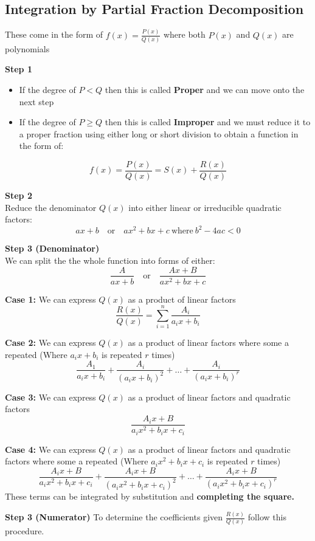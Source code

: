 \documentclass{template}
\begin{document}
\subsection{Integration by Partial Fraction Decomposition}
These come in the form of $\displaystyle f(x)=\frac{P(x)}{Q(x)}$ where both $P(x)$ and $Q(x)$ are polynomials

\textbf{Step 1}
\begin{itemize}
    \item If the degree of $P<Q$ then this is called \textbf{Proper} and we can move onto the next step
    \item If the degree of $P\geq Q$ then this is called \textbf{Improper} and we must reduce it to a proper fraction using either long or short division to obtain a function in the form of:
\end{itemize}
$$f(x)=\frac{P(x)}{Q(x)}=S(x)+\frac{R(x)}{Q(x)}$$

\textbf{Step 2} \\
Reduce the denominator $Q(x)$ into either linear or irreducible quadratic factors:
$$ax+b \quad \text{or} \quad ax^2+bx+c \ \text{where} \ b^2-4ac<0$$

\textbf{Step 3 (Denominator)}\\
We can split the the whole function into forms of either:
$$\frac{A}{ax+b} \quad \text{or} \quad \frac{Ax+B}{ax^2+bx+c}$$

\textbf{Case 1: } We can express $Q(x)$ as a product of linear factors
$$\frac{R(x)}{Q(x)}=\sum_{i=1}^n\frac{A_i}{a_ix+b_i}$$

\textbf{Case 2: } We can express $Q(x)$ as a product of linear factors where some a repeated  (Where $a_ix+b_i$ is repeated $r$ times)
$$\frac{A_1}{a_ix+b_i}+\frac{A_i}{(a_ix+b_i)^2}+\dots+\frac{A_i}{(a_ix+b_i)^r}$$

\textbf{Case 3: } We can express $Q(x)$ as a product of linear factors and quadratic factors
$$\frac{A_ix+B}{a_ix^2+b_ix+c_i}$$

\textbf{Case 4: } We can express $Q(x)$ as a product of linear factors and quadratic factors where some a repeated (Where $a_ix^2+b_ix+c_i$ is repeated $r$ times)
$$\frac{A_ix+B}{a_ix^2+b_ix+c_i}+\frac{A_ix+B}{(a_ix^2+b_ix+c_i)^2}+\dots+\frac{A_ix+B}{(a_ix^2+b_ix+c_i)^r}$$
These terms can be integrated by substitution and \textbf{completing the square.}

\vspace{3 mm}
\textbf{Step 3 (Numerator)}
To determine the coefficients given $\displaystyle\frac{R(x)}{Q(x)}$ follow this procedure.
\end{document}
